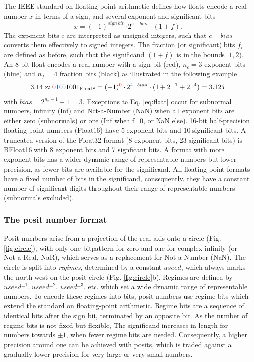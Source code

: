 \documentclass[draft]{agujournal2019}
\newcommand{\op}{\operatorname}
\begin{document}
The IEEE standard on floating-point arithmetic defines how floats encode a real
number $x$ in terms of a sign, and several exponent and significant bits
\begin{equation}
x = (-1)^{sign~bit} \cdot 2^{e-bias} \cdot (1+f).
\label{eq:float}
\end{equation}
The exponent bits $e$ are interpreted as unsigned integers, such that $e-bias$
converts them effectively to signed integers. The fraction (or significant) bits
$f_i$ are defined as before, such that the significand $(1+f)$ is in the bounds
$[1,2)$. An 8-bit float encodes a real number with a sign bit (red), $n_e = 3$
exponent bits (blue) and $n_f=4$ fraction bits (black) as illustrated in the
following example
\begin{equation}
3.14 \approx {\color{psign}0}{\color{pexpo}100}1001_{\op{Float8}} =
(-1)^{\color{psign}0} \cdot 2^{{\color{pexpo}4}-bias} \cdot (1+2^{-1}+2^{-4}) =
3.125
\label{eq:posit_pos}
\end{equation}
with $bias=2^{n_e-1} - 1 = 3$. Exceptions to Eq. \ref{eq:float} occur for
subnormal numbers, infinity (Inf) and Not-a-Number (NaN) when all exponent bits
are either zero (subnormals) or one (Inf when f=0, or NaN else). 16-bit half-precision
floating point numbers (Float16) have 5 exponent bits and 10 significant bits.
A truncated version of the Float32 format (8 exponent bits, 23 significant bits)
is BFloat16 with 8 exponent bits and 7 signficant bits. A format with more exponent
bits has a wider dynamic range of representable numbers but lower precision, as
fewer bits are available for the significand. All floating-point formats have a
fixed number of bits in the significand, consequently, they have a constant
number of significant digits throughout their range of representable numbers
(subnormals excluded).

\subsubsection{The posit number format}
\label{sec:posit_methods}

Posit numbers arise from a projection of the real axis onto a circle (Fig. \ref{fig:circle}),
with only one bitpattern for zero and one for complex infinity (or Not-a-Real, NaR),
which serves as a replacement for Not-a-Number (NaN). The circle is split into
\emph{regimes}, determined by a constant $useed$, which always marks the north-west
on the posit circle (Fig. \ref{fig:circle}b). Regimes are defined by
$useed^{\pm1}$, $useed^{\pm2}$, $useed^{\pm3}$, etc. which set a wide dynamic range of
representable numbers. To encode these regimes into bits, posit numbers use regime bits 
which extend the standard on floating-point arithmetic. Regime bits are a sequence of 
identical bits after the sign bit, terminated by an opposite bit. As the number 
of regime bits is not fixed but flexible, The significand increases in length for numbers
towards $\pm1$, when fewer regime bits are needed. Consequently, a higher precision around 
one can be achieved with posits, which is traded against a gradually lower precision for 
very large or very small numbers.
\end{document}
